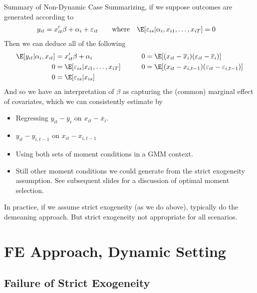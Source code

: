 \documentclass[aspectratio=169, handout]{beamer}
\begin{document}
{\scriptsize
\begin{frame}{%
    Summary of Non-Dynamic Case
}
Summarizing, if we suppose outcomes are generated according to
\begin{align*}
  y_{it}
  &=
  x_{it}'\beta
  + \alpha_i
  + \varepsilon_{it}
  \qquad\text{where}\quad
  \E[\varepsilon_{is}|\alpha_i,x_{i1},\ldots,x_{iT}]
  = 0
\end{align*}
Then we can deduce all of the following
\begin{alignat*}{3}
  \E[y_{it}|\alpha_i,x_{it}]
  &=
  x_{it}'\beta + \alpha_i
  \qquad
  &0
  &=
  \E[
  (x_{it} - \overline{x}_i)
  (\varepsilon_{it}-\overline{\varepsilon}_i)
  ]
  \\
  0 &= \E[\varepsilon_{is}|x_{i1},\ldots,x_{iT}]
  \qquad
  &0
  &=
  \E[(x_{it}-{x}_{i,t-1})(\varepsilon_{it}-{\varepsilon}_{i,t-1})]
  \\
  0
  &=
  \E[\varepsilon_{is}|x_{is}]
\end{alignat*}
And so we have an interpretation of $\beta$ as capturing the (common)
marginal effect of covariates, which we can consistently estimate by
\begin{itemize}
  \item Regressing
    $y_{it}-\overline{y}_i$
    on
    $x_{it}-\overline{x}_i$.
  \item
    $y_{it}-y_{i,t-1}$
    on
    $x_{it}-x_{i,t-1}$

  \item Using both sets of moment conditions in a GMM context.

  \item Still other moment conditions we could generate from the strict
    exogeneity assumption.
    See subsequent slides for a discussion of optimal moment selection.
\end{itemize}
In practice, if we assume strict exogeneity (as we do above), typically
do the demeaning approach.
But strict exogeneity not appropriate for all scenarios.
\end{frame}
}




\section{FE Approach, Dynamic Setting}

\subsection{Failure of Strict Exogeneity}
\end{document}
